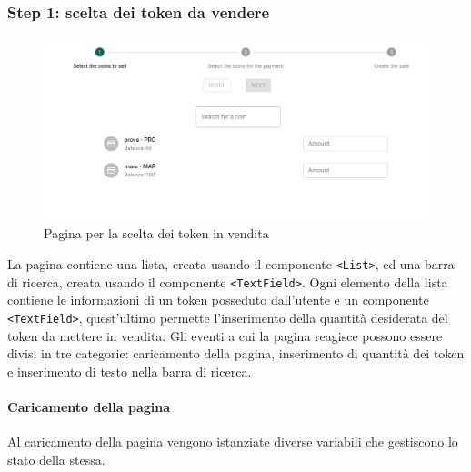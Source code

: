 \documentclass[a4paper]{article}
\begin{document}
        \subsubsection{Step 1: scelta dei token da vendere}
        \begin{figure}[ht]
          \includegraphics[width=\textwidth]{coinsToSell.png}
          \caption{Pagina per la scelta dei token in vendita}
          \centering
          \label{fig:resume}
        \end{figure}
        La pagina contiene una lista, creata usando il componente \verb|<List>|, ed una barra di ricerca, creata usando il componente \verb|<TextField>|.
        \newline
        Ogni elemento della lista contiene le informazioni di un token posseduto dall'utente e un componente
        \verb|<TextField>|, quest'ultimo permette l'inserimento della quantità desiderata del token da mettere in vendita.
        Gli eventi a cui la pagina reagisce possono essere divisi in tre categorie: caricamento della pagina, inserimento di quantità dei token e
        inserimento di testo nella barra di ricerca.
        \paragraph{Caricamento della pagina}
        Al caricamento della pagina vengono istanziate diverse variabili che gestiscono lo stato della stessa.
        \newpage
        \printbibliography
\end{document}
